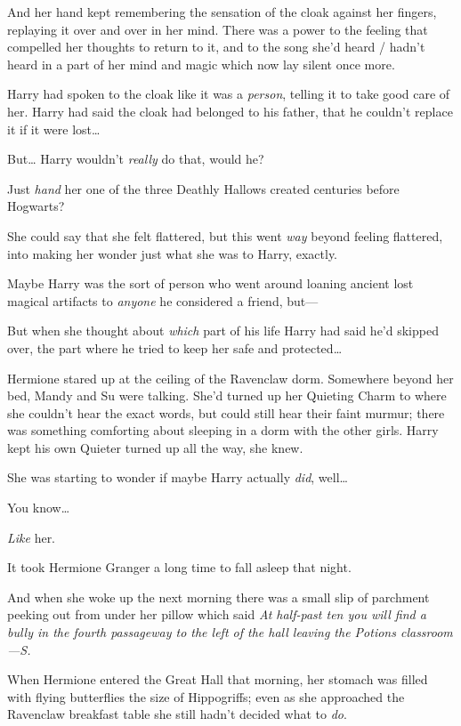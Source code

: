And her hand kept remembering the sensation of the cloak against her fingers, replaying it over and over in her mind. There was a power to the feeling that compelled her thoughts to return to it, and to the song she'd heard / hadn't heard in a part of her mind and magic which now lay silent once more.

Harry had spoken to the cloak like it was a \emph{person}, telling it to take good care of her. Harry had said the cloak had belonged to his father, that he couldn't replace it if it were lost{\ldots}

But{\ldots} Harry wouldn't \emph{really} do that, would he?

Just \emph{hand} her one of the three Deathly Hallows created centuries before Hogwarts?

She could say that she felt flattered, but this went \emph{way} beyond feeling flattered, into making her wonder just what she was to Harry, exactly.

Maybe Harry was the sort of person who went around loaning ancient lost magical artifacts to \emph{anyone} he considered a friend, but—

But when she thought about \emph{which} part of his life Harry had said he'd skipped over, the part where he tried to keep her safe and protected{\ldots}

Hermione stared up at the ceiling of the Ravenclaw dorm. Somewhere beyond her bed, Mandy and Su were talking. She'd turned up her Quieting Charm to where she couldn't hear the exact words, but could still hear their faint murmur; there was something comforting about sleeping in a dorm with the other girls. Harry kept his own Quieter turned up all the way, she knew.

She was starting to wonder if maybe Harry actually \emph{did}, well{\ldots}

You know{\ldots}

\emph{Like} her.

It took Hermione Granger a long time to fall asleep that night.

And when she woke up the next morning there was a small slip of parchment peeking out from under her pillow which said \emph{At half-past ten you will find a bully in the fourth passageway to the left of the hall leaving the Potions classroom—S.}

\later

When Hermione entered the Great Hall that morning, her stomach was filled with flying butterflies the size of Hippogriffs; even as she approached the Ravenclaw breakfast table she still hadn't decided what to \emph{do}.

